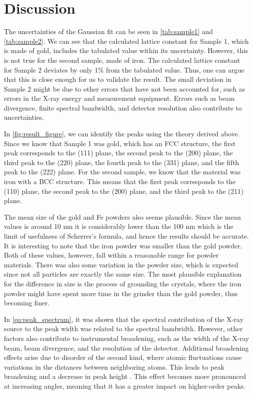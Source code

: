 \section{Discussion}
The uncertainties of the Gaussian fit can be seen in \autoref{tab:sample1} and \autoref{tab:sample2}. We can see that the calculated lattice constant for Sample 1, which is made of gold, includes the tabulated value within its uncertainty. However, this is not true for the second sample, made of iron. The calculated lattice constant for Sample 2 deviates by only 1\% from the tabulated value. Thus, one can argue that this is close enough for us to validate the result. The small deviation in Sample 2 might be due to other errors that have not been accounted for, such as errors in the X-ray energy and measurement equipment. Errors such as beam divergence, finite spectral bandwidth, and detector resolution also contribute to uncertainties.


In \autoref{fig:result_figure}, we can identify the peaks using the theory derived above. Since we know that Sample 1 was gold, which has an FCC structure, the first peak corresponds to the (111) plane, the second peak to the (200) plane, the third peak to the (220) plane, the fourth peak to the (331) plane, and the fifth peak to the (222) plane. For the second sample, we know that the material was iron with a BCC structure. This means that the first peak corresponds to the (110) plane, the second peak to the (200) plane, and the third peak to the (211) plane.

The mean size of the gold and Fe powders also seems plausible. Since the mean values is around 10 nm it is considerably lower than the 100 nm which is the limit of usefulness of Scherrer's formula, and hence the results should be accurate. It is interesting to note that the iron powder was smaller than the gold powder. Both of these values, however, fall within a reasonable range for powder materials. There was also some variation in the powder size, which is expected since not all particles are exactly the same size. The most plausible explanation for the difference in size is the process of grounding the crystals, where the iron powder might have spent more time in the grinder than the gold powder, thus becoming finer.

In \autoref{eq:peak_spectrum}, it was shown that the spectral contribution of the X-ray source to the peak width was related to the spectral bandwidth. However, other factors also contribute to instrumental broadening, such as the width of the X-ray beam, beam divergence, and the resolution of the detector. Additional broadening effects arise due to disorder of the second kind, where atomic fluctuations cause variations in the distances between neighboring atoms. This leads to peak broadening and a decrease in peak height \cite{guinier1963xray}. This effect becomes more pronounced at increasing angles, meaning that it has a greater impact on higher-order peaks.
